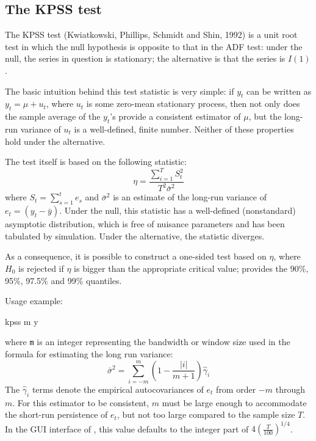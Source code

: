 \subsection{The KPSS test}
\label{sec:KPSStest}

The KPSS test (Kwiatkowski, Phillips, Schmidt and Shin, 1992) is a
unit root test in which the null hypothesis is opposite to that in the
ADF test: under the null, the series in question is stationary; the
alternative is that the series is $I(1)$.

The basic intuition behind this test statistic is very simple: if
$y_t$ can be written as $y_t = \mu + u_t$, where $u_t$ is some
zero-mean stationary process, then not only does the sample average of
the $y_t$'s provide a consistent estimator of $\mu$, but the long-run
variance of $u_t$ is a well-defined, finite number. Neither of these
properties hold under the alternative.

The test itself is based on the following statistic:
\begin{equation}
  \label{eq:KPSStest}
  \eta = \frac{\sum_{i=1}^T S_t^2 }{ T^2 \bar{\sigma}^2 }
\end{equation}
where $S_t = \sum_{s=1}^t e_s$ and $\bar{\sigma}^2$ is an estimate of
the long-run variance of $e_t = (y_t - \bar{y})$. Under the null, this
statistic has a well-defined (nonstandard) asymptotic distribution,
which is free of nuisance parameters and has been tabulated by
simulation. Under the alternative, the statistic diverges.

As a consequence, it is possible to construct a one-sided test based
on $\eta$, where $H_0$ is rejected if $\eta$ is bigger than the
appropriate critical value;  provides the 90\%, 95\%,
97.5\% and 99\% quantiles.

Usage example:
\begin{code}
  kpss m y
\end{code}
where \verb|m| is an integer representing the bandwidth or window
size used in the formula for estimating the long run variance:
\[
  \bar{\sigma}^2 = \sum_{i=-m}^m \left( 1 - \frac{|i|}{m+1} \right) \hat{\gamma}_i
\]
The $\hat{\gamma}_i$ terms denote the empirical autocovariances of
$e_t$ from order $-m$ through $m$.  For this estimator to be
consistent, $m$ must be large enough to accommodate the short-run
persistence of $e_t$, but not too large compared to the sample size
$T$.  In the GUI interface of , this value defaults to the
integer part of $4 \left( \frac{T}{100} \right)^{1/4}$.

